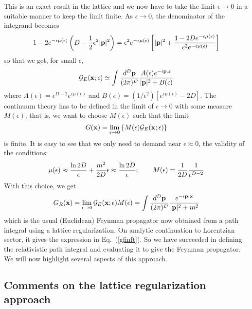 \documentclass[12pt]{article}
\def\eq#1{{Eq.~(\ref{#1})}}
\begin{document}
This is an exact result in the lattice and we now have to
take the limit $\epsilon\to 0$ in a suitable manner to keep the limit finite. 
As $\epsilon\to 0$, the denominator of the integrand
becomes
\begin{eqnarray} 
 1-2e^{-\epsilon\mu(\epsilon)}
\left( D-{1\over 2}\epsilon^2|{\mathbf p}|^2\right)=
 \epsilon^2 e^{-\epsilon\mu(\epsilon)}
\left[|{\mathbf p}|^2+
{1-2De^{-\epsilon\mu(\epsilon)}\over \epsilon^2 e^{-\epsilon\mu(\epsilon)}}\right]
 \end{eqnarray}
so that we  get, for small $\epsilon$,
\begin{equation} 
{\cal G}_E({\mathbf x};\epsilon)\simeq
\int{d^D{\mathbf p}\over (2\pi)^D}
{A(\epsilon)e^{-i{\mathbf p.x}}\over |{\mathbf p}|^2+B(\epsilon)} 
\end{equation} 
where
$ 
 A(\epsilon)= \epsilon^{D-2}e^{\epsilon\mu(\epsilon)}
 $
 and
 $
B(\epsilon)=(1/ \epsilon^2)
[e^{\epsilon\mu(\epsilon)}-2D].
$
The continuum theory has to be defined in the limit of
$\epsilon\to 0$ with some measure $M(\epsilon)$; that is, we want to choose $M(\epsilon)$ such that the limit
\begin{equation} 
G({\mathbf x})=
\lim_{\epsilon\to 0}
\left\{M(\epsilon){\cal G}_E({\mathbf x};\epsilon)\right\} 
\end{equation} 
is finite. It is easy to see that 
we only need to demand
 near $\epsilon\approx 0$, the validity of the conditions:
\begin{equation}
 \mu(\epsilon)\approx {\ln 2D\over \epsilon}
+{m^2\over 2D}\epsilon
\approx {\ln 2D\over \epsilon}; \qquad M(\epsilon)={1\over 2D}{1\over \epsilon^{D-2}} 
\label{qmeas}
\end{equation} 
 With this choice, we get
\begin{equation} 
G_R(\mathbf{x})=\lim_{\epsilon\to 0}{\cal G}_E
({\mathbf x};\epsilon)M(\epsilon)=\int
{d^D{\mathbf p}\over(2\pi)^D}
{e^{-i\mathbf{ p.x}}\over |{\mathbf p}|^2+m^2} 
\label{eightfour}
\end{equation} 
which is the usual (Euclidean) Feynman propagator now obtained from a path integral using a lattice regularization. On analytic continuation to Lorentzian sector, it gives the expression in \eq{gfinft}. So we have succeeded in defining the relativistic path integral and evaluating it to give the Feynman propagator. We will now highlight several aspects of this approach.

\subsection{Comments on the lattice regularization approach}\label{sec:comlattice}
\end{document}
